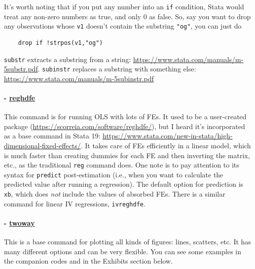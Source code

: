 It's worth noting that if you put any number into an \verb|if| condition, Stata would treat any non-zero numbers as true, and only 0 as false. So, say you want to drop any observations whose \verb|v1| doesn't contain the substring \verb|"og"|, you can just do 
\begin{verbatim}
    drop if !strpos(v1,"og")
\end{verbatim}

\verb|substr| extracts a substring from a string: \url{https://www.stata.com/manuals/m-5substr.pdf}. \verb|subinstr| replaces a substring with something else: \url{https://www.stata.com/manuals/m-5subinstr.pdf}

\paragraph{- \underline{reghdfe}} This command is for running OLS with lots of FEs. It used to be a user-created package (\url{https://scorreia.com/software/reghdfe/}), but I heard it's incorporated as a base command in Stata 19: \url{https://www.stata.com/new-in-stata/high-dimensional-fixed-effects/}. It takes care of FEs efficiently in a linear model, which is much faster than creating dummies for each FE and then inverting the matrix, etc., as the traditional \verb|reg| command does. One note is to pay attention to its syntax for \verb|predict| post-estimation (i.e., when you want to calculate the predicted value after running a regression). The default option for prediction is \verb|xb|, which does \textit{not} include the values of absorbed FEs. There is a similar command for linear IV regressions, \verb|ivreghdfe|.

\paragraph{- \underline{twoway}} This is a base command for plotting all kinds of figures: lines, scatters, etc. It has many different options and can be very flexible. You can see some examples in the companion codes and in the Exhibits section below. 

